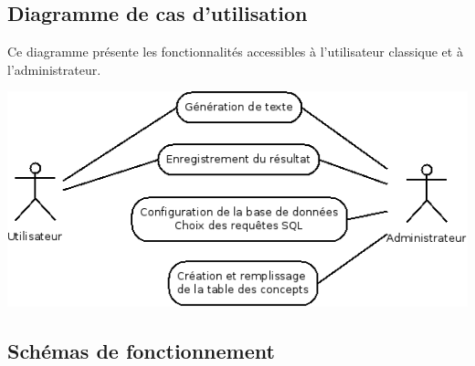 \documentclass[12pt]{report}
\begin{document}
\subsection{Diagramme de cas d'utilisation}

	Ce diagramme présente les fonctionnalités accessibles à l'utilisateur classique et à l'administrateur.

	\includegraphics[scale=0.8]{Diagramme1.png}

\subsection{Schémas de fonctionnement}
\end{document}
